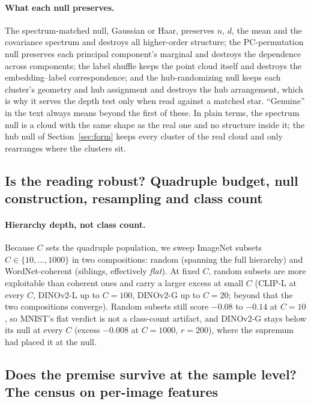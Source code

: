 \documentclass{article}
\theoremstyle{definition}
\begin{document}
\paragraph{What each null preserves.} The spectrum-matched null, Gaussian or Haar, preserves $n$, $d$, the mean and the covariance spectrum and destroys all higher-order structure; the PC-permutation null preserves each principal component's marginal and destroys the dependence across components; the label shuffle keeps the point cloud itself and destroys the embedding--label correspondence; and the hub-randomizing null keeps each cluster's geometry and hub assignment and destroys the hub arrangement, which is why it serves the depth test only when read against a matched star. ``Genuine'' in the text always means beyond the first of these. In plain terms, the spectrum null is a cloud with the same shape as the real one and no structure inside it; the hub null of Section~\ref{sec:form} keeps every cluster of the real cloud and only rearranges where the clusters sit.


\FloatBarrier
\subsection{Is the reading robust? Quadruple budget, null construction, resampling and class count}
\label{app:robust}
\label{app:csweep}
\paragraph{Hierarchy depth, not class count.} Because $C$ sets the quadruple population, we sweep ImageNet subsets $C\in\{10,\dots,1000\}$ in two compositions: random (spanning the full hierarchy) and WordNet-coherent (siblings, effectively \emph{flat}). At fixed $C$, random subsets are more exploitable than coherent ones and carry a larger excess at small $C$ (CLIP-L at every $C$, DINOv2-L up to $C{=}100$, DINOv2-G up to $C{=}20$; beyond that the two compositions converge). Random subsets still score $-0.08$ to $-0.14$ at $C{=}10$, so MNIST's flat verdict is not a class-count artifact, and DINOv2-G stays below its null at every $C$ (excess $-0.008$ at $C{=}1000$, $r{=}200$), where the supremum had placed it at the null. %


\FloatBarrier
\subsection{Does the premise survive at the sample level? The census on per-image features}
\label{app:sample}

\end{document}
